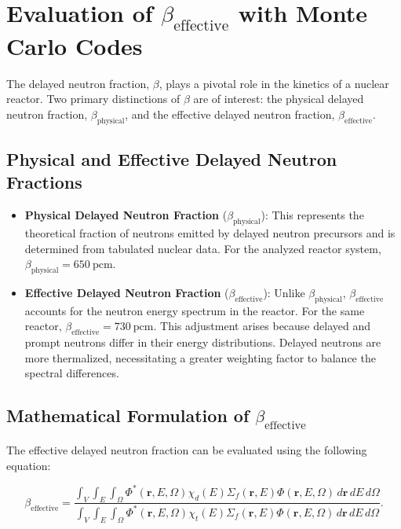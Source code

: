 {\section{Evaluation of \texorpdfstring{$\beta_{\text{effective}}$}{Beta-effective} with Monte Carlo Codes}

The delayed neutron fraction, $\beta$, plays a pivotal role in the kinetics of a nuclear reactor. Two primary distinctions of $\beta$ are of interest: the physical delayed neutron fraction, $\beta_{\text{physical}}$, and the effective delayed neutron fraction, $\beta_{\text{effective}}$.

\subsection{Physical and Effective Delayed Neutron Fractions}

\begin{itemize}
    \item \textbf{Physical Delayed Neutron Fraction} ($\beta_{\text{physical}}$): This represents the theoretical fraction of neutrons emitted by delayed neutron precursors and is determined from tabulated nuclear data. For the analyzed reactor system, $\beta_{\text{physical}} = 650 \ \text{pcm}$.
    \item \textbf{Effective Delayed Neutron Fraction} ($\beta_{\text{effective}}$): Unlike $\beta_{\text{physical}}$, $\beta_{\text{effective}}$ accounts for the neutron energy spectrum in the reactor. For the same reactor, $\beta_{\text{effective}} = 730 \ \text{pcm}$. This adjustment arises because delayed and prompt neutrons differ in their energy distributions. Delayed neutrons are more thermalized, necessitating a greater weighting factor to balance the spectral differences.
\end{itemize}

\subsection{Mathematical Formulation of \texorpdfstring{$\beta_{\text{effective}}$}{Beta-effective}}

The effective delayed neutron fraction can be evaluated using the following equation:

\[
\beta_{\text{effective}} = 
\frac{\int_V \int_E \int_\Omega \Phi^*(\mathbf{r}, E, \Omega) \chi_d(E) \Sigma_{f}(\mathbf{r}, E) \Phi(\mathbf{r}, E, \Omega) \, d\mathbf{r} \, dE \, d\Omega}
{\int_V \int_E \int_\Omega \Phi^*(\mathbf{r}, E, \Omega) \chi_t(E) \Sigma_{f}(\mathbf{r}, E) \Phi(\mathbf{r}, E, \Omega) \, d\mathbf{r} \, dE \, d\Omega}.
\]

}
